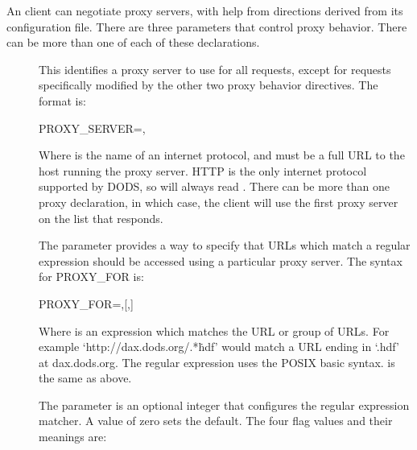 An \opendap client can negotiate proxy servers, with help from directions
derived from its configuration file.  There are three parameters that
control proxy behavior.  There can be more than one of each of these
declarations.

\begin{description}
\item[] This identifies a proxy server to use for
  all \opendap requests, except for requests specifically modified by the
  other two proxy behavior directives.  The format is:

  \begin{example}
PROXY_SERVER=,
  \end{example}
  
  Where  is the name of an internet protocol, and
   must be a full URL to the host running the proxy
  server.  HTTP is the only internet protocol supported by DODS, so
   will always read .  There can be more than
  one proxy declaration, in which case, the \opendap client will use the
  first proxy server on the list that responds.
  
\item[] The  parameter provides a way
  to specify that URLs which match a regular expression should be
  accessed using a particular proxy server. The syntax for PROXY_FOR
  is:

  \begin{example}
PROXY_FOR=,[,]
  \end{example}

  Where  is an expression which matches the
  URL or group of URLs. For example `http://dax.dods.org/.*\.hdf'
  would match a URL ending in `.hdf' at dax.dods.org. The regular
  expression uses the POSIX basic syntax. is the
  same as above.

  The  parameter is an optional integer that configures the
  regular expression matcher. A value of zero sets the default. The
  four flag values and their meanings are:


\end{description}
